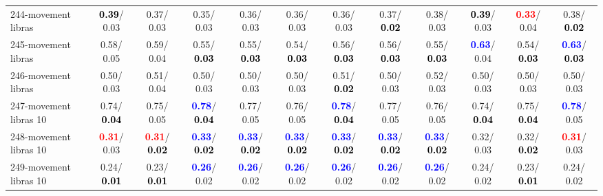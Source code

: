 \begin{table}[h]
\begin{center}
{\begin{tabular}{lc|c|c|c|c|c|c|c|c|c|c}
244-movement libras & \textcolor{black}{\textbf{  0.39}}/  0.03 &   0.37/  0.03 &   0.35/  0.03 &   0.36/  0.03 &   0.36/  0.03 &   0.36/  0.03 &   0.37/\textcolor{black}{\textbf{  0.02}} &   0.38/  0.03 & \textcolor{black}{\textbf{  0.39}}/  0.03 & \textcolor{red}{\textbf{  0.33}}/  0.04 &   0.38/\textcolor{black}{\textbf{  0.02}} \\
245-movement libras &   0.58/  0.05 &   0.59/  0.04 &   0.55/\textcolor{black}{\textbf{  0.03}} &   0.55/\textcolor{black}{\textbf{  0.03}} &   0.54/\textcolor{black}{\textbf{  0.03}} &   0.56/\textcolor{black}{\textbf{  0.03}} &   0.56/\textcolor{black}{\textbf{  0.03}} &   0.55/\textcolor{black}{\textbf{  0.03}} & \textcolor{blue}{\textbf{  0.63}}/  0.04 &   0.54/\textcolor{black}{\textbf{  0.03}} & \textcolor{blue}{\textbf{  0.63}}/\textcolor{black}{\textbf{  0.03}} \\ \hline
246-movement libras &   0.50/  0.03 &   0.51/  0.04 &   0.50/  0.03 &   0.50/  0.03 &   0.50/  0.03 &   0.51/\textcolor{black}{\textbf{  0.02}} &   0.50/  0.03 &   0.52/  0.03 &   0.50/  0.03 &   0.50/  0.03 &   0.50/  0.03 \\
247-movement libras 10 &   0.74/\textcolor{black}{\textbf{  0.04}} &   0.75/  0.05 & \textcolor{blue}{\textbf{  0.78}}/\textcolor{black}{\textbf{  0.04}} &   0.77/  0.05 &   0.76/  0.05 & \textcolor{blue}{\textbf{  0.78}}/\textcolor{black}{\textbf{  0.04}} &   0.77/  0.05 &   0.76/  0.05 &   0.74/\textcolor{black}{\textbf{  0.04}} &   0.75/\textcolor{black}{\textbf{  0.04}} & \textcolor{blue}{\textbf{  0.78}}/  0.05 \\
248-movement libras 10 & \textcolor{red}{\textbf{  0.31}}/  0.03 & \textcolor{red}{\textbf{  0.31}}/\textcolor{black}{\textbf{  0.02}} & \textcolor{blue}{\textbf{  0.33}}/\textcolor{black}{\textbf{  0.02}} & \textcolor{blue}{\textbf{  0.33}}/\textcolor{black}{\textbf{  0.02}} & \textcolor{blue}{\textbf{  0.33}}/\textcolor{black}{\textbf{  0.02}} & \textcolor{blue}{\textbf{  0.33}}/\textcolor{black}{\textbf{  0.02}} & \textcolor{blue}{\textbf{  0.33}}/\textcolor{black}{\textbf{  0.02}} & \textcolor{blue}{\textbf{  0.33}}/\textcolor{black}{\textbf{  0.02}} &   0.32/  0.03 &   0.32/\textcolor{black}{\textbf{  0.02}} & \textcolor{red}{\textbf{  0.31}}/  0.03 \\
249-movement libras 10 &   0.24/\textcolor{black}{\textbf{  0.01}} &   0.23/\textcolor{black}{\textbf{  0.01}} & \textcolor{blue}{\textbf{  0.26}}/  0.02 & \textcolor{blue}{\textbf{  0.26}}/  0.02 & \textcolor{blue}{\textbf{  0.26}}/  0.02 & \textcolor{blue}{\textbf{  0.26}}/  0.02 & \textcolor{blue}{\textbf{  0.26}}/  0.02 & \textcolor{blue}{\textbf{  0.26}}/  0.02 &   0.24/  0.02 &   0.23/\textcolor{black}{\textbf{  0.01}} &   0.24/  0.02 \\

\end{tabular}}
\end{center}
\end{table}
